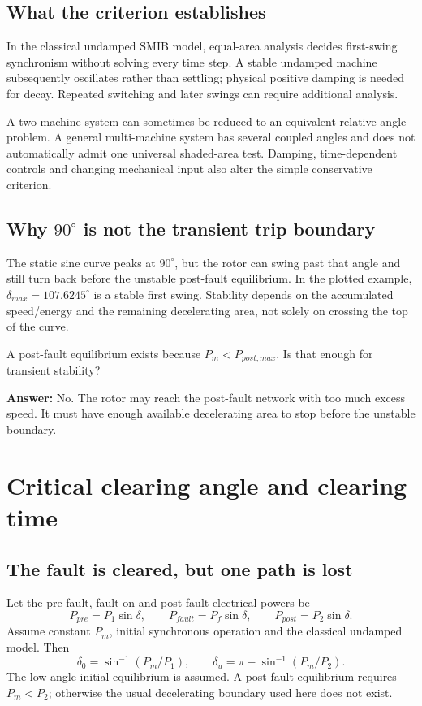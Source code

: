 \documentclass[11pt,a4paper]{article}
\newcommand{\chapterstart}[2]{\par\needspace{12\baselineskip}\section{#1}\label{#2}}
\newcommand{\checkq}[2]{\begin{tcolorbox}[breakable=false,colback=pale,colframe=teal,coltitle=white,title={Check your understanding}]#1\par\textbf{Answer:} #2\end{tcolorbox}}
\begin{document}
\subsection{What the criterion establishes}
In the classical undamped SMIB model, equal-area analysis decides first-swing synchronism without solving every time step. A stable undamped machine subsequently oscillates rather than settling; physical positive damping is needed for decay. Repeated switching and later swings can require additional analysis.

A two-machine system can sometimes be reduced to an equivalent relative-angle problem. A general multi-machine system has several coupled angles and does not automatically admit one universal shaded-area test. Damping, time-dependent controls and changing mechanical input also alter the simple conservative criterion.
\subsection{Why \texorpdfstring{$90^\circ$}{90 degrees} is not the transient trip boundary}
The static sine curve peaks at $90^\circ$, but the rotor can swing past that angle and still turn back before the unstable post-fault equilibrium. In the plotted example, $\delta_{max}=107.6245^\circ$ is a stable first swing. Stability depends on the accumulated speed/energy and the remaining decelerating area, not solely on crossing the top of the curve.
\checkq{A post-fault equilibrium exists because $P_m<P_{post,max}$. Is that enough for transient stability?}{No. The rotor may reach the post-fault network with too much excess speed. It must have enough available decelerating area to stop before the unstable boundary.}

\chapterstart{Critical clearing angle and clearing time}{critical}
\subsection{The fault is cleared, but one path is lost}
Let the pre-fault, fault-on and post-fault electrical powers be
\[
P_{pre}=P_1\sin\delta,\qquad
P_{fault}=P_f\sin\delta,\qquad
P_{post}=P_2\sin\delta.
\]
Assume constant $P_m$, initial synchronous operation and the classical undamped model. Then
\[
\delta_0=\sin^{-1}(P_m/P_1),\qquad
\delta_u=\pi-\sin^{-1}(P_m/P_2).
\]
The low-angle initial equilibrium is assumed. A post-fault equilibrium requires $P_m<P_2$; otherwise the usual decelerating boundary used here does not exist.
\end{document}
